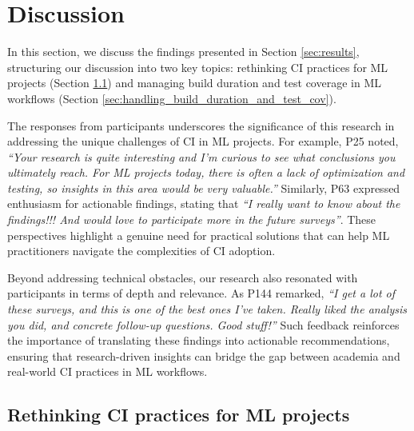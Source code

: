 \section{Discussion}
\label{sec:discussion}

In this section, we discuss the findings presented in Section \ref{sec:results}, structuring our discussion into two key topics: rethinking CI practices for ML projects (Section \ref{sec:disc_rethinking_ci_practices}) and managing build duration and test coverage in ML workflows (Section \ref{sec:handling_build_duration_and_test_cov}).


The responses from participants underscores the significance of this research in addressing the unique challenges of CI in ML projects. For example, P25 noted, \textit{``Your research is quite interesting and I'm curious to see what conclusions you ultimately reach. For ML projects today, there is often a lack of optimization and testing, so insights in this area would be very valuable.''} Similarly, P63 expressed enthusiasm for actionable findings, stating that \textit{``I really want to know about the findings!!! And would love to participate more in the future surveys''}. These perspectives highlight a genuine need for practical solutions that can help ML practitioners navigate the complexities of CI adoption. 

Beyond addressing technical obstacles, our research also resonated with participants in terms of depth and relevance. As P144 remarked, \textit{``I get a lot of these surveys, and this is one of the best ones I've taken. Really liked the analysis you did, and concrete follow-up questions. Good stuff!''} 
Such feedback reinforces the importance of translating these findings into actionable recommendations, ensuring that research-driven insights can bridge the gap between academia and real-world CI practices in ML workflows.

\subsection{Rethinking CI practices for ML projects}
\label{sec:disc_rethinking_ci_practices}

